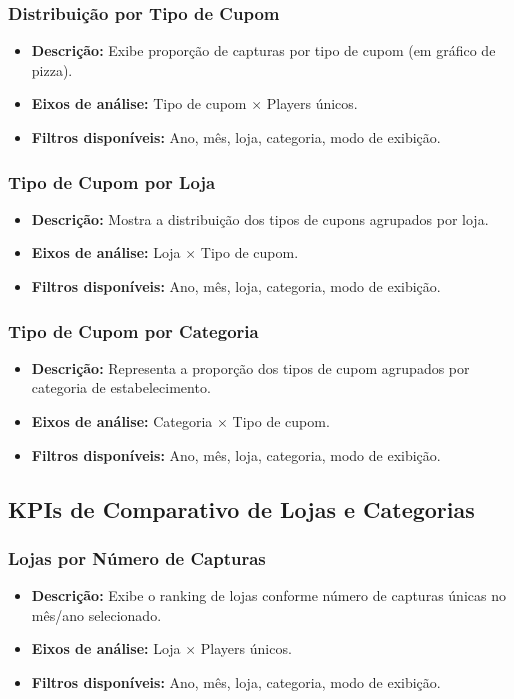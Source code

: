 \documentclass[12pt]{article}
\begin{document}
\subsubsection{Distribuição por Tipo de Cupom}
\begin{itemize}
    \item \textbf{Descrição:} Exibe proporção de capturas por tipo de cupom (em gráfico de pizza).
    \item \textbf{Eixos de análise:} Tipo de cupom × Players únicos.
    \item \textbf{Filtros disponíveis:} Ano, mês, loja, categoria, modo de exibição.
\end{itemize}

\subsubsection{Tipo de Cupom por Loja}
\begin{itemize}
    \item \textbf{Descrição:} Mostra a distribuição dos tipos de cupons agrupados por loja.
    \item \textbf{Eixos de análise:} Loja × Tipo de cupom.
    \item \textbf{Filtros disponíveis:} Ano, mês, loja, categoria, modo de exibição.
\end{itemize}

\subsubsection{Tipo de Cupom por Categoria}
\begin{itemize}
    \item \textbf{Descrição:} Representa a proporção dos tipos de cupom agrupados por categoria de estabelecimento.
    \item \textbf{Eixos de análise:} Categoria × Tipo de cupom.
    \item \textbf{Filtros disponíveis:} Ano, mês, loja, categoria, modo de exibição.
\end{itemize}

\subsection{KPIs de Comparativo de Lojas e Categorias}
\subsubsection{Lojas por Número de Capturas}
\begin{itemize}
    \item \textbf{Descrição:} Exibe o ranking de lojas conforme número de capturas únicas no mês/ano selecionado.
    \item \textbf{Eixos de análise:} Loja × Players únicos.
    \item \textbf{Filtros disponíveis:} Ano, mês, loja, categoria, modo de exibição.
\end{itemize}
\end{document}
